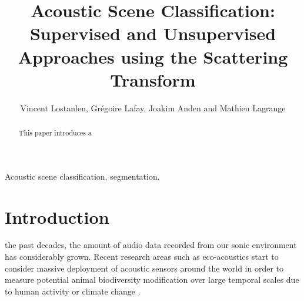 \documentclass[journal]{IEEEtran}
\begin{document}
%
\title{Acoustic Scene Classification: \\ Supervised and Unsupervised Approaches using the Scattering Transform}

\author{Vincent Lostanlen, Gr\'egoire Lafay, Joakim Anden and Mathieu Lagrange}


\maketitle

\begin{abstract}
This paper introduces a 
\end{abstract}

\begin{IEEEkeywords}
Acoustic scene classification, segmentation.
\end{IEEEkeywords}






%
\IEEEpeerreviewmaketitle

\section{Introduction}

 the past decades, the amount of audio data recorded from our sonic environment has considerably grown. Recent research areas such as eco-acoustics \cite{ECOACOUSTICS2014, krause} start to consider massive deployment of acoustic sensors around the world in order to measure potential animal biodiversity modification over large temporal scales due to human activity or climate change \cite{NessSST13, stowell13a, stowell13b}. 
\end{document}
